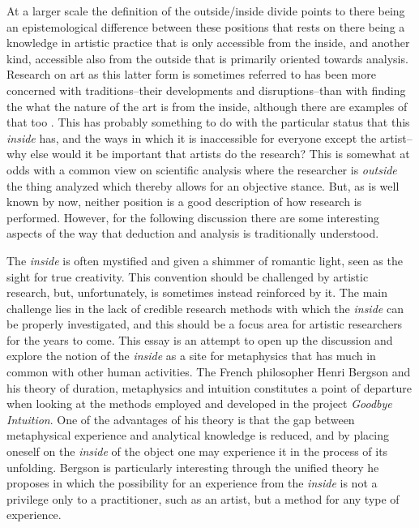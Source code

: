 \documentclass[11pt]{article}
\begin{document}
At a larger scale the definition of the outside/inside divide points to there being an epistemological difference between these positions that rests on there being a knowledge in artistic practice that is only accessible from the inside, and another kind, accessible also from the outside that is primarily oriented towards analysis. Research on art as this latter form is sometimes referred to has been more concerned with traditions--their developments and disruptions--than with finding the what the nature of the art is from the inside, although there are examples of that too \citep[see e.g. ][ ]{monson96}. This has probably something to do with the particular status that this \emph{inside} has, and the ways in which it is inaccessible for everyone except the artist--why else would it be important that artists do the research? This is somewhat at odds with a common view on scientific analysis where the researcher is \emph{outside} the thing analyzed which thereby allows for an objective stance. But, as is well known by now, neither position is a good description of how research is performed. However, for the following discussion there are some interesting aspects of the way that deduction and analysis is traditionally understood.

The \emph{inside} is often mystified and given a shimmer of romantic light, seen as the sight for true creativity. This convention should be challenged by artistic research, but, unfortunately, is sometimes instead reinforced by it. The main challenge lies in the lack of credible research methods with which the \emph{inside} can be properly investigated, and this should be a focus area for artistic researchers for the years to come. This essay is an attempt to open up the discussion and explore the notion of the \emph{inside} as a site for metaphysics that has much in common with other human activities. The French philosopher Henri Bergson and his theory of duration, metaphysics and intuition constitutes a point of departure when looking at the methods employed and developed in the project \emph{Goodbye Intuition}. One of the advantages of his theory is that the gap between metaphysical experience and analytical knowledge is reduced, and by placing oneself on the \emph{inside} of the object one may experience it in the process of its unfolding. Bergson is particularly interesting through the unified theory he proposes in which the possibility for an experience from the \emph{inside} is not a privilege only to a practitioner, such as an artist, but a method for any type of experience. 
\end{document}
